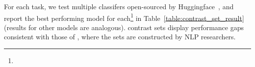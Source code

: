 For each task, we test multiple classifers open-sourced by Huggingface~\cite{Wolf2019HuggingFacesTS}, and report the best performing model for each\footnote{} in Table~\ref{table:contrast_set_result} (results for other models are analogous). \sysname contrast sets display performance gaps consistent with those of \citet{gardner2020contrast}, where the sets are constructed by NLP researchers.



\TableContrastSet

\TableAugSST
\TableAugNLI

